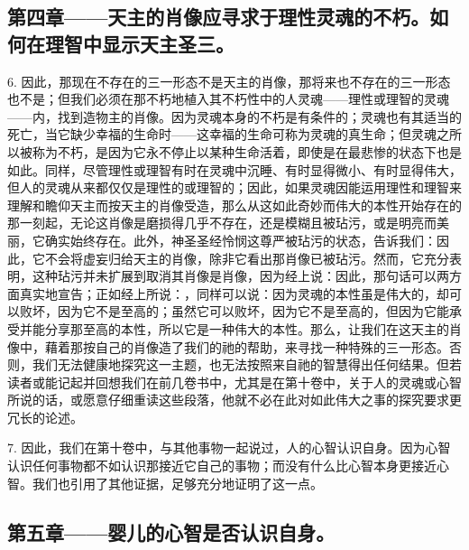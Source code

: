 
\subsection{第四章——天主的肖像应寻求于理性灵魂的不朽。如何在理智中显示天主圣三。}

6. 因此，那现在不存在的三一形态不是天主的肖像，那将来也不存在的三一形态也不是；但我们必须在那不朽地植入其不朽性中的人灵魂——理性或理智的灵魂——内，找到造物主的肖像。因为灵魂本身的不朽是有条件的；灵魂也有其适当的死亡，当它缺少幸福的生命时——这幸福的生命可称为灵魂的真生命；但灵魂之所以被称为不朽，是因为它永不停止以某种生命活着，即使是在最悲惨的状态下也是如此。同样，尽管理性或理智有时在灵魂中沉睡、有时显得微小、有时显得伟大，但人的灵魂从来都仅仅是理性的或理智的；因此，如果灵魂因能运用理性和理智来理解和瞻仰天主而按天主的肖像受造，那么从这如此奇妙而伟大的本性开始存在的那一刻起，无论这肖像是磨损得几乎不存在，还是模糊且被玷污，或是明亮而美丽，它确实始终存在。此外，神圣圣经怜悯这尊严被玷污的状态，告诉我们：因此，它不会将虚妄归给天主的肖像，除非它看出那肖像已被玷污。然而，它充分表明，这种玷污并未扩展到取消其肖像是肖像，因为经上说：因此，那句话可以两方面真实地宣告；正如经上所说：，同样可以说：因为灵魂的本性虽是伟大的，却可以败坏，因为它不是至高的；虽然它可以败坏，因为它不是至高的，但因为它能承受并能分享那至高的本性，所以它是一种伟大的本性。那么，让我们在这天主的肖像中，藉着那按自己的肖像造了我们的祂的帮助，来寻找一种特殊的三一形态。否则，我们无法健康地探究这一主题，也无法按照来自祂的智慧得出任何结果。但若读者或能记起并回想我们在前几卷书中，尤其是在第十卷中，关于人的灵魂或心智所说的话，或愿意仔细重读这些段落，他就不必在此对如此伟大之事的探究要求更冗长的论述。\par

7. 因此，我们在第十卷中，与其他事物一起说过，人的心智认识自身。因为心智认识任何事物都不如认识那接近它自己的事物；而没有什么比心智本身更接近心智。我们也引用了其他证据，足够充分地证明了这一点。\par


\subsection{第五章——婴儿的心智是否认识自身。}

